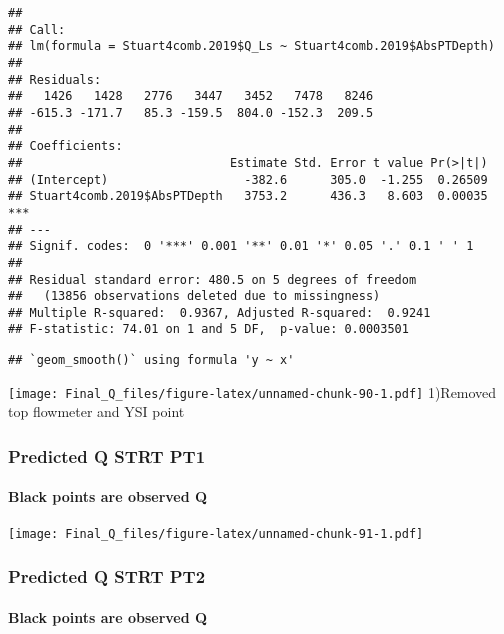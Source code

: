 \documentclass[
]{article}
\begin{document}
\begin{verbatim}
## 
## Call:
## lm(formula = Stuart4comb.2019$Q_Ls ~ Stuart4comb.2019$AbsPTDepth)
## 
## Residuals:
##   1426   1428   2776   3447   3452   7478   8246 
## -615.3 -171.7   85.3 -159.5  804.0 -152.3  209.5 
## 
## Coefficients:
##                             Estimate Std. Error t value Pr(>|t|)    
## (Intercept)                   -382.6      305.0  -1.255  0.26509    
## Stuart4comb.2019$AbsPTDepth   3753.2      436.3   8.603  0.00035 ***
## ---
## Signif. codes:  0 '***' 0.001 '**' 0.01 '*' 0.05 '.' 0.1 ' ' 1
## 
## Residual standard error: 480.5 on 5 degrees of freedom
##   (13856 observations deleted due to missingness)
## Multiple R-squared:  0.9367, Adjusted R-squared:  0.9241 
## F-statistic: 74.01 on 1 and 5 DF,  p-value: 0.0003501
\end{verbatim}

\begin{verbatim}
## `geom_smooth()` using formula 'y ~ x'
\end{verbatim}

\texttt{[image: Final\_Q\_files/figure-latex/unnamed-chunk-90-1.pdf]}
1)Removed top flowmeter and YSI point

\hypertarget{predicted-q-strt-pt1}{%
\subsubsection{Predicted Q STRT PT1}\label{predicted-q-strt-pt1}}

\hypertarget{black-points-are-observed-q-8}{%
\paragraph{Black points are observed
Q}\label{black-points-are-observed-q-8}}

\texttt{[image: Final\_Q\_files/figure-latex/unnamed-chunk-91-1.pdf]}

\hypertarget{predicted-q-strt-pt2}{%
\subsubsection{Predicted Q STRT PT2}\label{predicted-q-strt-pt2}}

\hypertarget{black-points-are-observed-q-9}{%
\paragraph{Black points are observed
Q}\label{black-points-are-observed-q-9}}
\end{document}
